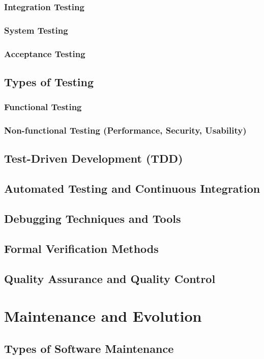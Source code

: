 \begin{refsection}
\subsubsection{Integration Testing}
\subsubsection{System Testing}
\subsubsection{Acceptance Testing}
\subsection{Types of Testing}
\subsubsection{Functional Testing}
\subsubsection{Non-functional Testing (Performance, Security, Usability)}
\subsection{Test-Driven Development (TDD)}
\subsection{Automated Testing and Continuous Integration}
\subsection{Debugging Techniques and Tools}
\subsection{Formal Verification Methods}
\subsection{Quality Assurance and Quality Control}

\newpage

\section{Maintenance and Evolution}
\subsection{Types of Software Maintenance}

\end{refsection}
